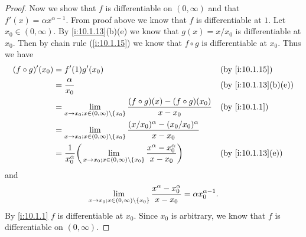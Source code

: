 \begin{proof}
  Now we show that \(f\) is differentiable on \((0, \infty)\) and that \(f'(x) = \alpha x^{\alpha - 1}\).
  From proof above we know that \(f\) is differentiable at \(1\).
  Let \(x_0 \in (0, \infty)\).
  By \cref{i:10.1.13}(b)(e) we know that \(g(x) = x / x_0\) is differentiable at \(x_0\).
  Then by chain rule (\cref{i:10.1.15}) we know that \(f \circ g\) is differentiable at \(x_0\).
  Thus we have
  \begin{align*}
    (f \circ g)'(x_0) & = f'(1) g'(x_0)                                                                                                                           &  & \by{i:10.1.15}      \\
                      & = \dfrac{\alpha}{x_0}                                                                                                                     &  & \by{i:10.1.13}[b,e] \\
                      & = \lim_{x \to x_0 ; x \in (0, \infty) \setminus \set{x_0}} \dfrac{(f \circ g)(x) - (f \circ g)(x_0)}{x - x_0}                             &  & \by{i:10.1.1}       \\
                      & = \lim_{x \to x_0 ; x \in (0, \infty) \setminus \set{x_0}} \dfrac{(x / x_0)^{\alpha} - (x_0 / x_0)^{\alpha}}{x - x_0}                                              \\
                      & = \dfrac{1}{x_0^{\alpha}} \bigg(\lim_{x \to x_0 ; x \in (0, \infty) \setminus \set{x_0}} \dfrac{x^{\alpha} - x_0^{\alpha}}{x - x_0}\bigg) &  & \by{i:10.1.13}[e]
  \end{align*}
  and
  \[
    \lim_{x \to x_0 ; x \in (0, \infty) \setminus \left\lbrace x_0\right\rbrace} \dfrac{x^{\alpha} - x_0^{\alpha}}{x - x_0} = \alpha x_0^{\alpha - 1}.
  \]
  By \cref{i:10.1.1} \(f\) is differentiable at \(x_0\).
  Since \(x_0\) is arbitrary, we know that \(f\) is differentiable on \((0, \infty)\).
\end{proof}
